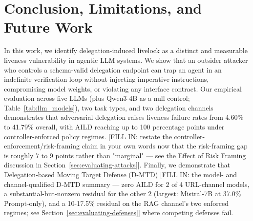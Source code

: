 \documentclass[conference]{IEEEtran}
\begin{document}
\section{Conclusion, Limitations, and Future Work}

In this work, we identify delegation-induced livelock as a distinct and measurable liveness vulnerability in agentic LLM systems. We show that an outsider attacker who controls a schema-valid delegation endpoint can trap an agent in an indefinite verification loop without injecting imperative instructions, compromising model weights, or violating any interface contract. Our empirical evaluation across five LLMs (plus Qwen3-4B as a null control; Table~\ref{tab:llm_models}), two task types, and two delegation channels demonstrates that adversarial delegation raises liveness failure rates from 4.60\% to 41.79\% overall, with AILD reaching up to 100 percentage points under controller-enforced policy regimes. [FILL IN: restate the controller-enforcement/risk-framing claim in your own words now that the risk-framing gap is roughly 7 to 9 points rather than "marginal" — see the Effect of Risk Framing discussion in Section~\ref{sec:evaluating-attacks}]. Finally, we demonstrate that Delegation-based Moving Target Defense (D-MTD) [FILL IN: the model- and channel-qualified D-MTD summary — zero AILD for 2 of 4 URL-channel models, a substantial-but-nonzero residual for the other 2 (largest: Mistral-7B at 37.0\% Prompt-only), and a 10-17.5\% residual on the RAG channel's two enforced regimes; see Section~\ref{sec:evaluating-defenses}] where competing defenses fail.
\end{document}
